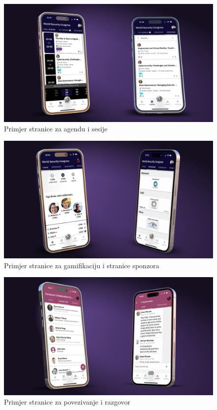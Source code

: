 		\begin{figure}
			\centering
			\includegraphics[width=1\linewidth]{slike/runevents-agenda.png}
			\caption{Primjer stranice za agendu i sesije}
			\label{fig:agenda-sessions}
		\end{figure}
		
		\begin{figure}
			\centering
			\includegraphics[width=1\linewidth]{slike/runevents-gameandsponsors.png}
			\caption{Primjer stranice za gamifikaciju i stranice sponzora}
			\label{fig:game-sponsors}
		\end{figure}
		
		\begin{figure}
			\centering
			\includegraphics[width=1\linewidth]{slike/runevents-connectandchat.png}
			\caption{Primjer stranice za povezivanje i razgovor}
			\label{fig:connect-chat}
		\end{figure}
		
